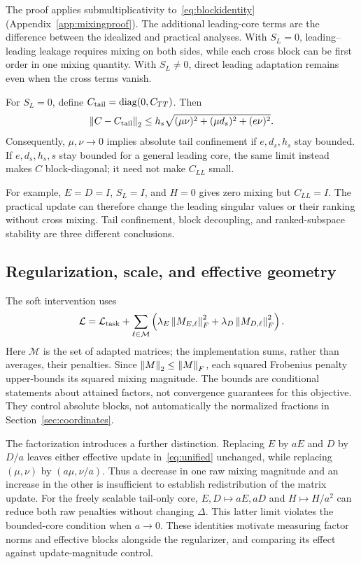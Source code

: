 The proof applies submultiplicativity to~\eqref{eq:blockidentity} (Appendix~\ref{app:mixingproof}). The additional leading-core terms are the difference between the idealized and practical analyses. With $S_L=0$, leading--leading leakage requires mixing on both sides, while each cross block can be first order in one mixing quantity. With $S_L\ne0$, direct leading adaptation remains even when the cross terms vanish.

\begin{corollary}
\label{cor:confinement}
For $S_L=0$, define $C_{\mathrm{tail}}=\operatorname{diag}(0,C_{TT})$. Then
\begin{equation}
\left\|C-C_{\mathrm{tail}}\right\|_2
\le h_s\sqrt{(\mu\nu)^2+(\mu d_s)^2+(e\nu)^2}.
\label{eq:offbound}
\end{equation}
Consequently, $\mu,\nu\to0$ implies absolute tail confinement if $e,d_s,h_s$ stay bounded. If $e,d_s,h_s,s$ stay bounded for a general leading core, the same limit instead makes $C$ block-diagonal; it need not make $C_{LL}$ small.
\end{corollary}

For example, $E=D=I$, $S_L=I$, and $H=0$ gives zero mixing but $C_{LL}=I$. The practical update can therefore change the leading singular values or their ranking without cross mixing. Tail confinement, block decoupling, and ranked-subspace stability are three different conclusions.

\subsection{Regularization, scale, and effective geometry}
The soft intervention uses
\begin{equation}
\mathcal L=\mathcal L_{\mathrm{task}}
+\sum_{\ell\in\mathcal M}\left(\lambda_E\left\|M_{E,\ell}\right\|_F^2+\lambda_D\left\|M_{D,\ell}\right\|_F^2\right).
\label{eq:regularizer}
\end{equation}
Here $\mathcal M$ is the set of adapted matrices; the implementation sums, rather than averages, their penalties. Since $\left\|M\right\|_2\le\left\|M\right\|_F$, each squared Frobenius penalty upper-bounds its squared mixing magnitude. The bounds are conditional statements about attained factors, not convergence guarantees for this objective. They control absolute blocks, not automatically the normalized fractions in Section~\ref{sec:coordinates}.

The factorization introduces a further distinction. Replacing $E$ by $aE$ and $D$ by $D/a$ leaves either effective update in~\eqref{eq:unified} unchanged, while replacing $(\mu,\nu)$ by $(a\mu,\nu/a)$. Thus a decrease in one raw mixing magnitude and an increase in the other is insufficient to establish redistribution of the matrix update. For the freely scalable tail-only core, $E,D\mapsto aE,aD$ and $H\mapsto H/a^2$ can reduce both raw penalties without changing $\Delta$. This latter limit violates the bounded-core condition when $a\to0$. These identities motivate measuring factor norms and effective blocks alongside the regularizer, and comparing its effect against update-magnitude control.

